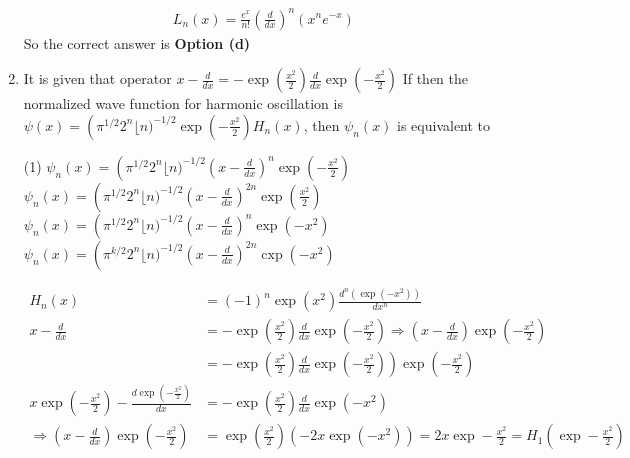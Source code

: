 \begin{enumerate}[label=\color{ocre}\textbf{\arabic*.}]
\begin{tasks}
\end{tasks}
\begin{answer}
	\begin{align*}
	L_{n}(x)=\frac{e^{x}}{n !}\left(\frac{d}{d x}\right)^{n}\left(x^{n} e^{-x}\right)
	\end{align*}
		So the correct answer is \textbf{Option (d)}
\end{answer}
\item It is given that operator $x-\frac{d}{d x}=-\exp \left(\frac{x^{2}}{2}\right) \frac{d}{d x} \exp \left(-\frac{x^{2}}{2}\right)$
If then the normalized wave function for harmonic oscillation is $\psi(x)=\left(\pi^{1 / 2} 2^{n}\lfloor n)^{-1 / 2} \exp \left(-\frac{x^{2}}{2}\right) H_{n}(x)\right.$, then $\psi_n(x)$ is equivalent to 
 \begin{tasks}(1)
	\task[\textbf{a.}]$\psi_{n}(x)=\left(\pi^{1 / 2} 2^{n}\lfloor n)^{-1 / 2}\left(x-\frac{d}{d x}\right)^{n} \exp \left(-\frac{x^{2}}{2}\right)\right.$
	\task[\textbf{b.}] $\psi_{n}(x)=\left(\pi^{1 / 2} 2^{n}\lfloor n)^{-1 / 2}\left(x-\frac{d}{d x}\right)^{2 n} \exp \left(\frac{x^{2}}{2}\right)\right.$
	\task[\textbf{c.}] $\psi_{n}(x)=\left(\pi^{1 / 2} 2^{n}\lfloor n)^{-1 / 2}\left(x-\frac{d}{d x}\right)^{n} \exp \left(-x^{2}\right)\right.$
	\task[\textbf{d.}] $\psi_{n}(x)=\left(\pi^{k / 2} 2^{n}\lfloor n)^{-1 / 2}\left(x-\frac{d}{d x}\right)^{2 n} \operatorname{cxp}\left(-x^{2}\right)\right.$
\end{tasks}
\begin{answer}
	\begin{align*}
	H_{n}(x)&=(-1)^{n} \exp \left(x^{2}\right) \frac{d^{n}\left(\exp \left(-x^{2}\right)\right)}{d x^{n}}\\
	x-\frac{d}{d x} &=-\exp \left(\frac{x^{2}}{2}\right) \frac{d}{d x} \exp \left(-\frac{x^{2}}{2}\right) \Rightarrow\left(x-\frac{d}{d x}\right) \exp \left(-\frac{x^{2}}{2}\right) \\ &\left.=-\exp \left(\frac{x^{2}}{2}\right) \frac{d}{d x} \exp \left(-\frac{x^{2}}{2}\right)\right) \exp \left(-\frac{x^{2}}{2}\right)\\
	x \exp \left(-\frac{x^{2}}{2}\right)-\frac{d \exp \left(-\frac{x^{2}}{2}\right)}{d x}&=-\exp \left(\frac{x^{2}}{2}\right) \frac{d}{d x} \exp \left(-x^{2}\right)\\
	\Rightarrow\left(x-\frac{d}{d x}\right) \exp \left(-\frac{x^{2}}{2}\right)&=\exp \left(\frac{x^{2}}{2}\right)\left(-2 x \exp \left(-x^{2}\right)\right)=2 x \exp -\frac{x^{2}}{2}=H_{1}\left(\exp -\frac{x^{2}}{2}\right)\\

\end{align*}
\end{answer}
\end{enumerate}
